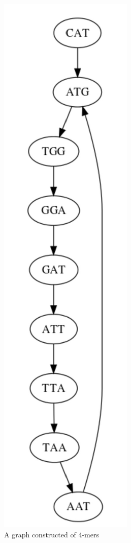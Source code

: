 \documentclass[letterpaper, 10 pt]{ieeeconf}
\begin{document}
  \begin{figure}[thpb]
    \centering
    \includegraphics[scale=0.4]{images/fig4-1.jpg}
    \caption{A graph constructed of 4-mers}
    \label{fig4}
  \end{figure}
\end{document}
